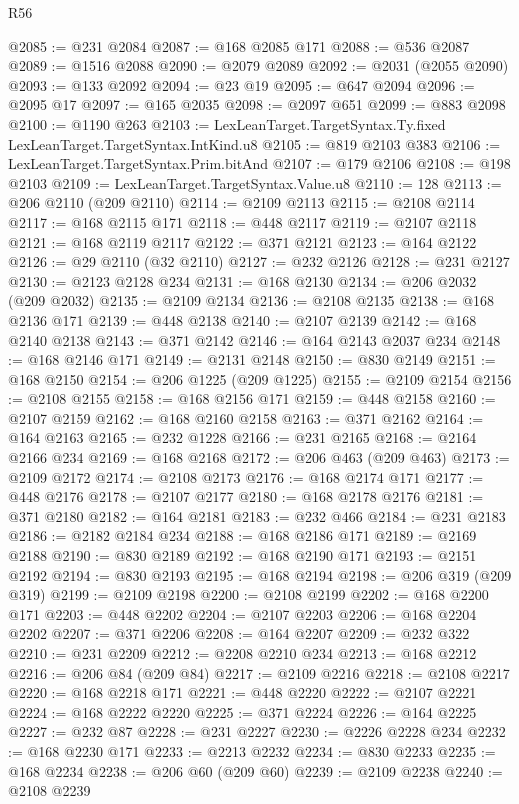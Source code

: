 \begin{lexlean}{R56}
\begin{coremodule}
{{{{{{{{{{{{{{{{{{{{{{{{{{{{{{{{{{{{{{{{{{{{{{{{{{{{{{{{{{{{{{{{{{{{{{{{{{{{{{{{{{{{{{{{{{{{{{{{{{{{{{{{{{{{{{{{{{{{{{{{{{{{{{{{{{{{{{{{{{{{{{{{{{{{{{{{{{{{{{{{{{{{{{{{{{{{{{{{{{{{{{{{{{{{{{{{{{{{{{{{{{{{{{{{{{{@2085 := @231 @2084
@2087 := @168 @2085 @171
@2088 := @536 @2087
@2089 := @1516 @2088
@2090 := @2079 @2089
@2092 := @2031 (@2055 @2090)
@2093 := @133 @2092
@2094 := @23 @19
@2095 := @647 @2094
@2096 := @2095 @17
@2097 := @165 @2035
@2098 := @2097 @651
@2099 := @883 @2098
@2100 := @1190 @263
@2103 := LexLeanTarget.TargetSyntax.Ty.fixed LexLeanTarget.TargetSyntax.IntKind.u8
@2105 := @819 @2103 @383
@2106 := LexLeanTarget.TargetSyntax.Prim.bitAnd
@2107 := @179 @2106
@2108 := @198 @2103
@2109 := LexLeanTarget.TargetSyntax.Value.u8
@2110 := 128
@2113 := @206 @2110 (@209 @2110)
@2114 := @2109 @2113
@2115 := @2108 @2114
@2117 := @168 @2115 @171
@2118 := @448 @2117
@2119 := @2107 @2118
@2121 := @168 @2119 @2117
@2122 := @371 @2121
@2123 := @164 @2122
@2126 := @29 @2110 (@32 @2110)
@2127 := @232 @2126
@2128 := @231 @2127
@2130 := @2123 @2128 @234
@2131 := @168 @2130
@2134 := @206 @2032 (@209 @2032)
@2135 := @2109 @2134
@2136 := @2108 @2135
@2138 := @168 @2136 @171
@2139 := @448 @2138
@2140 := @2107 @2139
@2142 := @168 @2140 @2138
@2143 := @371 @2142
@2146 := @164 @2143 @2037 @234
@2148 := @168 @2146 @171
@2149 := @2131 @2148
@2150 := @830 @2149
@2151 := @168 @2150
@2154 := @206 @1225 (@209 @1225)
@2155 := @2109 @2154
@2156 := @2108 @2155
@2158 := @168 @2156 @171
@2159 := @448 @2158
@2160 := @2107 @2159
@2162 := @168 @2160 @2158
@2163 := @371 @2162
@2164 := @164 @2163
@2165 := @232 @1228
@2166 := @231 @2165
@2168 := @2164 @2166 @234
@2169 := @168 @2168
@2172 := @206 @463 (@209 @463)
@2173 := @2109 @2172
@2174 := @2108 @2173
@2176 := @168 @2174 @171
@2177 := @448 @2176
@2178 := @2107 @2177
@2180 := @168 @2178 @2176
@2181 := @371 @2180
@2182 := @164 @2181
@2183 := @232 @466
@2184 := @231 @2183
@2186 := @2182 @2184 @234
@2188 := @168 @2186 @171
@2189 := @2169 @2188
@2190 := @830 @2189
@2192 := @168 @2190 @171
@2193 := @2151 @2192
@2194 := @830 @2193
@2195 := @168 @2194
@2198 := @206 @319 (@209 @319)
@2199 := @2109 @2198
@2200 := @2108 @2199
@2202 := @168 @2200 @171
@2203 := @448 @2202
@2204 := @2107 @2203
@2206 := @168 @2204 @2202
@2207 := @371 @2206
@2208 := @164 @2207
@2209 := @232 @322
@2210 := @231 @2209
@2212 := @2208 @2210 @234
@2213 := @168 @2212
@2216 := @206 @84 (@209 @84)
@2217 := @2109 @2216
@2218 := @2108 @2217
@2220 := @168 @2218 @171
@2221 := @448 @2220
@2222 := @2107 @2221
@2224 := @168 @2222 @2220
@2225 := @371 @2224
@2226 := @164 @2225
@2227 := @232 @87
@2228 := @231 @2227
@2230 := @2226 @2228 @234
@2232 := @168 @2230 @171
@2233 := @2213 @2232
@2234 := @830 @2233
@2235 := @168 @2234
@2238 := @206 @60 (@209 @60)
@2239 := @2109 @2238
@2240 := @2108 @2239
}}}}}}}}}}}}}}}}}}}}}}}}}}}}}}}}}}}}}}}}}}}}}}}}}}}}}}}}}}}}}}}}}}}}}}}}}}}}}}}}}}}}}}}}}}}}}}}}}}}}}}}}}}}}}}}}}}}}}}}}}}}}}}}}}}}}}}}}}}}}}}}}}}}}}}}}}}}}}}}}}}}}}}}}}}}}}}}}}}}}}}}}}}}}}}}}}}}}}}}}}}}}}}}}}}}
\end{coremodule}
\end{lexlean}
